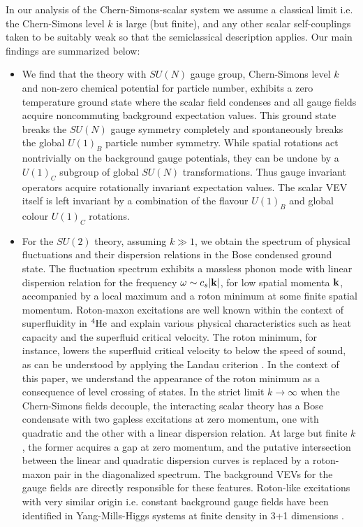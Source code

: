  In our analysis of the Chern-Simons-scalar system we  assume a classical limit i.e.  the Chern-Simons level $k$ is large (but finite), and any other scalar self-couplings taken to be  suitably weak so that the semiclassical description applies.  Our main findings are summarized below:
 \begin{itemize}
 \item{We find that the theory with $SU(N)$ gauge group, Chern-Simons level $k$ and non-zero chemical potential for particle number, exhibits a zero temperature ground state where  the scalar field condenses and all gauge fields acquire noncommuting background expectation values.  This ground state breaks the $SU(N)$ gauge symmetry completely and spontaneously breaks the global $U(1)_B$ particle number symmetry. While spatial rotations act nontrivially on the background gauge potentials, they  can be undone by a $U(1)_C$ subgroup of global $SU(N)$ transformations.  Thus gauge invariant operators acquire rotationally  invariant expectation values. The scalar VEV itself is left invariant by a combination of the flavour $U(1)_B$ and global colour $U(1)_C$ rotations. }
 \item{For the $SU(2)$ theory, assuming $k\gg 1$, we obtain the spectrum of physical fluctuations and their dispersion relations in the Bose condensed ground state. The fluctuation spectrum exhibits a massless phonon mode with linear dispersion relation 
 for the frequency $\omega\sim c_s |{\bf k}|$, for low spatial momenta ${\bf k}$, accompanied by a local maximum and a roton minimum at some finite spatial momentum.  Roton-maxon excitations are well known within the context of superfluidity in ${}^4{\rm He}$  \cite{Landau:1941vsj, schmitt} and explain various physical characteristics such as heat capacity and the superfluid critical velocity. The roton minimum, for instance, lowers the superfluid critical velocity to below the speed of sound, as can be understood by applying the Landau criterion \cite{Landau:1941vsj, schmitt}. In the context of this paper, we understand the appearance of the roton minimum as a consequence of level crossing of states. In the strict limit $k\to \infty$ when the Chern-Simons fields decouple, the interacting scalar theory has a Bose condensate with two gapless excitations at zero momentum, one with quadratic and the other with a linear dispersion relation. At  large but finite $k$, the former acquires a gap at zero momentum, and the putative intersection between the linear and quadratic dispersion curves is replaced by a roton-maxon pair in the diagonalized spectrum. The background VEVs for the gauge fields are directly responsible for these features. Roton-like excitations with very similar origin i.e. constant background gauge fields have been identified in Yang-Mills-Higgs systems at finite density in 3+1 dimensions \cite{Gusynin:2003yu}.
 
}
\end{itemize}
